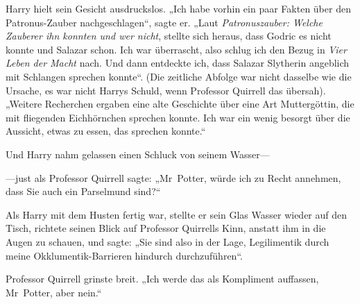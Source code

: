 Harry hielt sein Gesicht ausdruckslos. „Ich habe vorhin ein paar Fakten über den Patronus-Zauber nachgeschlagen“, sagte er. „Laut \emph{Patronuszauber: Welche Zauberer ihn konnten und wer nicht}, stellte sich heraus, dass Godric es nicht konnte und Salazar schon. Ich war überrascht, also schlug ich den Bezug in \emph{Vier Leben der Macht} nach. Und dann entdeckte ich, dass Salazar Slytherin angeblich mit Schlangen sprechen konnte“. (Die zeitliche Abfolge war nicht dasselbe wie die Ursache, es war nicht Harrys Schuld, wenn Professor Quirrell das übersah). „Weitere Recherchen ergaben eine alte Geschichte über eine Art Muttergöttin, die mit fliegenden Eichhörnchen sprechen konnte. Ich war ein wenig besorgt über die Aussicht, etwas zu essen, das sprechen konnte.“

Und Harry nahm gelassen einen Schluck von seinem Wasser—

—just als Professor Quirrell sagte: „Mr~Potter, würde ich zu Recht annehmen, dass Sie auch ein Parselmund sind?“

Als Harry mit dem Husten fertig war, stellte er sein Glas Wasser wieder auf den Tisch, richtete seinen Blick auf Professor Quirrells Kinn, anstatt ihm in die Augen zu schauen, und sagte: „Sie sind also in der Lage, Legilimentik durch meine Okklumentik-Barrieren hindurch durchzuführen“.

Professor Quirrell grinste breit. „Ich werde das als Kompliment auffassen, Mr~Potter, aber nein.“


